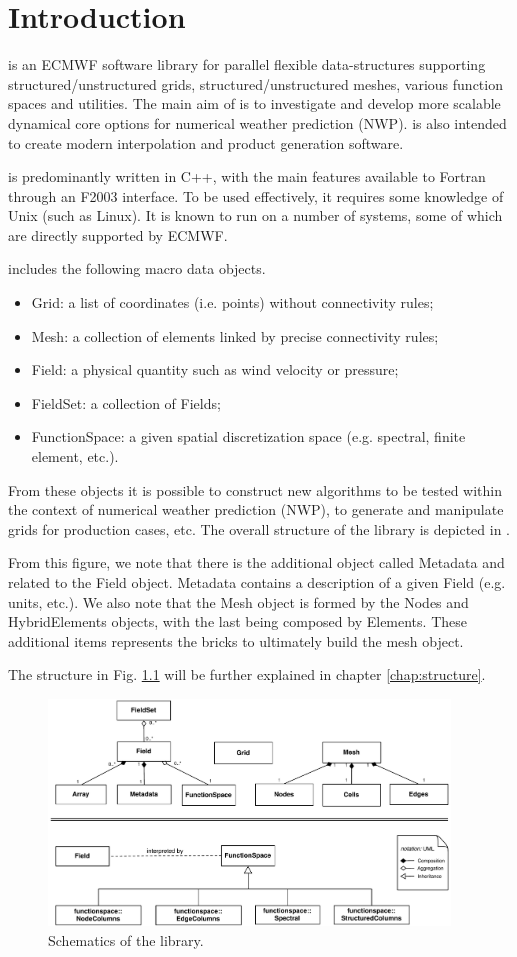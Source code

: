 \chapter{Introduction}
\Atlas is an ECMWF software library for parallel flexible 
data-structures supporting structured/unstructured grids, 
structured/unstructured meshes, various function spaces 
and utilities.  
The main aim of \Atlas is to investigate and develop more 
scalable dynamical core options for numerical weather prediction 
(NWP). \Atlas is also intended to create modern interpolation 
and product generation software.

\Atlas is predominantly written in C++, with the main features 
available to Fortran through an F2003 interface. To be used 
effectively, it requires some knowledge of Unix (such as Linux). 
It is known to run on a number of systems, some of which are 
directly supported by ECMWF.

\Atlas includes the following macro data objects.
%
\begin{itemize}
\item Grid: a list of coordinates (i.e. points) without connectivity rules;
\item Mesh: a collection of elements linked by precise connectivity rules;
\item Field: a physical quantity such as wind velocity or pressure;
\item FieldSet: a collection of Fields;
\item FunctionSpace: a given spatial discretization space (e.g. spectral, 
finite element, etc.).
\end{itemize}
%
From these objects it is possible to construct new algorithms 
to be tested within the context of numerical weather prediction 
(NWP), to generate and manipulate grids for production 
cases, etc. The overall structure of the library is depicted 
in .

From this figure, we note that there is the additional object 
called Metadata and related to the Field object. Metadata 
contains a description of a given Field (e.g. units, etc.).
We also note that the Mesh object is formed by the Nodes 
and HybridElements objects, with the last being composed 
by Elements. These additional items represents the bricks 
to ultimately build the mesh object.
 
The structure in Fig. \ref{fig:intro-schematics} will be 
further explained in chapter \ref{chap:structure}.
%
\begin{figure}[htb!]
\centering
\includegraphics[width=0.95\textwidth]{imgs/schematics.pdf}
\caption{Schematics of the \Atlas library.}
\label{fig:intro-schematics}
\end{figure}
%